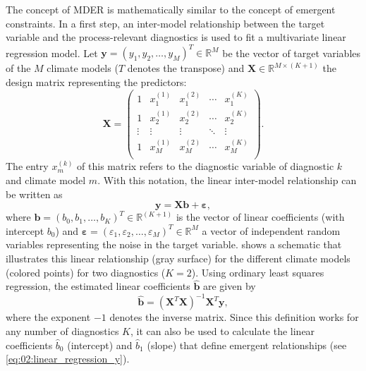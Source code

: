 The concept of \ac{MDER} is mathematically similar to the concept of emergent
constraints. In a first step, an inter-model relationship between the target
variable and the process-relevant diagnostics is used to fit a multivariate
linear regression model. Let $\bm{y} = \left( y_1, y_2, \ldots, y_M \right)^T
\in \mathbb{R}^M$ be the vector of target variables of the $M$ climate models
($T$ denotes the transpose) and $\bm{X} \in \mathbb{R}^{M \times (K + 1)}$ the
design matrix representing the predictors:
\begin{equation}
  \bm{X} =
  \begin{pmatrix}
    1 & x_1^{(1)} & x_1^{(2)} & \cdots & x_1^{(K)} \\
    1 & x_2^{(1)} & x_2^{(2)} & \cdots & x_2^{(K)} \\
    \vdots & \vdots & \vdots & \ddots & \vdots \\
    1 & x_M^{(1)} & x_M^{(2)} & \cdots & x_M^{(K)} \\
  \end{pmatrix}.
  \label{eq:02:design_matrix}
\end{equation}
The entry $x_m^{(k)}$ of this matrix refers to the diagnostic variable of
diagnostic $k$ and climate model $m$. With this notation, the linear
inter-model relationship can be written as
\begin{equation}
  \bm{y} = \bm{X} \bm{b} + \bm{\varepsilon},
  \label{eq:02:multivariate_linear_model}
\end{equation}
where $\bm{b} = \left( b_0, b_1, \ldots, b_K \right)^T \in \mathbb{R}^{(K +
  1)}$ is the vector of linear coefficients (with intercept $b_0$) and
$\bm{\varepsilon} = \left( \varepsilon_1, \varepsilon_2, \ldots, \varepsilon_M
\right)^T \in \mathbb{R}^M$ a vector of independent random variables
representing the noise in the target variable.  shows a
schematic that illustrates this linear relationship (gray surface) for the
different climate models (colored points) for two diagnostics ($K = 2$). Using
ordinary least squares regression, the estimated linear coefficients
$\hat{\bm{b}}$ are given by
\begin{equation}
  \hat{\bm{b}} = \left( \bm{X}^T \bm{X} \right)^{-1} \bm{X}^T \bm{y},
  \label{eq:02:linear_coefficients}
\end{equation}
where the exponent $-1$ denotes the inverse matrix. Since this definition works
for any number of diagnostics $K$, it can also be used to calculate the linear
coefficients $\hat{b}_0$ (intercept) and $\hat{b}_1$ (slope) that define
emergent relationships (see \cref{eq:02:linear_regression_y}).

